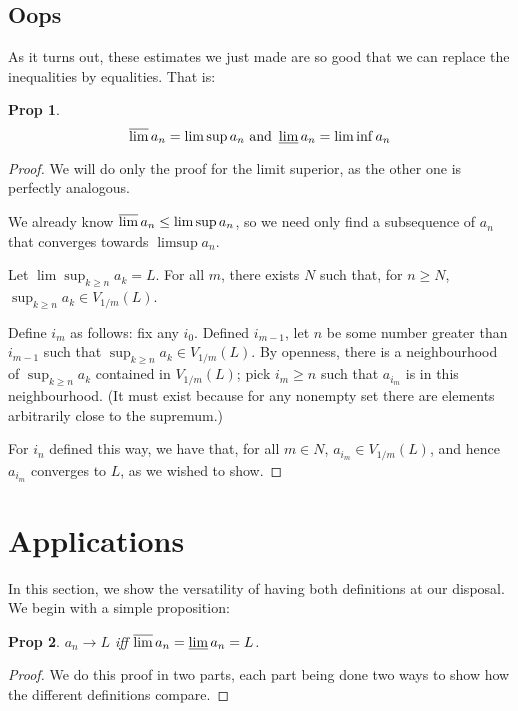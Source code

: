 \documentclass{article}
\newtheorem{prop}{Prop}
\theoremstyle{definition}
\begin{document}
	\subsection{Oops}
	
	As it turns out, these estimates we just made are so good that we can replace the inequalities by equalities. That is:
	
	\begin{prop}
	\[\varlimsup a_n = \limsup a_n \text{ and } \varliminf a_n = \liminf a_n\]
	\end{prop}
	
	\begin{proof}
	We will do only the proof for the limit superior, as the other one is perfectly analogous.
	
	We already know $\varlimsup a_n \leq \limsup a_n$, so we need only find a subsequence of $a_n$ that converges towards $\limsup a_n$.
	
	Let $\lim \sup_{k \geq n} a_k = L$. For all $m$, there exists $N$ such that, for $n \geq N$, $\sup_{k \geq n} a_k \in V_{1/m}(L)$.
	
	Define $i_m$ as follows: fix any $i_0$. Defined $i_{m-1}$, let $n$ be some number greater than $i_{m-1}$ such that $\sup_{k \geq n} a_k \in V_{1/m}(L)$. By openness, there is a neighbourhood of $\sup_{k \geq n} a_k$ contained in $V_{1/m}(L)$; pick $i_m \geq n$ such that $a_{i_m}$ is in this neighbourhood. (It must exist because for any nonempty set there are elements arbitrarily close to the supremum.)
	
	For $i_n$ defined this way, we have that, for all $m \in N$, $a_{i_m} \in V_{1/m}(L)$, and hence $a_{i_m}$ converges to $L$, as we wished to show.
	\end{proof}
	
	\section{Applications}
	
	In this section, we show the versatility of having both definitions at our disposal. We begin with a simple proposition:
	
	\begin{prop}
	$a_n \rightarrow L$ iff $\varlimsup a_n = \varliminf a_n = L$.
	\end{prop}
	
	\begin{proof}
	We do this proof in two parts, each part being done two ways to show how the different definitions compare.
	
	
	\end{proof}
\end{document}
